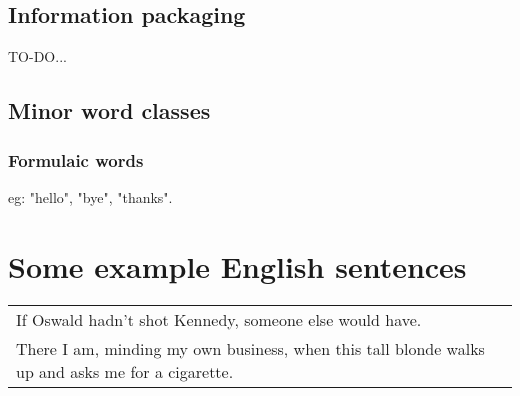 \subsection{Information packaging}

TO-DO...

\subsection{Minor word classes}

\subsubsection{Formulaic words}

eg: "hello", "bye", "thanks".

\section{Some example English sentences}
\label{sec:English-examples}

\underconst

\begin{tabular}{|l|l|}
If Oswald hadn't shot Kennedy, someone else would have. & \formula{?} \\
There I am, minding my own business, when this tall blonde walks up and asks me for a cigarette. & \formula{?} \\
\end{tabular}
